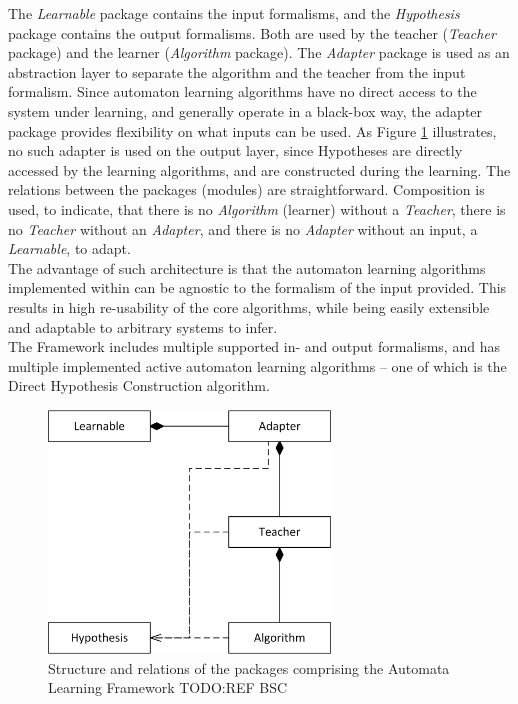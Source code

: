 \smallskip

The \textit{Learnable} package contains the input formalisms, and the \textit{Hypothesis} package contains the output formalisms. Both are used by the teacher (\textit{Teacher} package) and the learner (\textit{Algorithm} package). The \textit{Adapter} package is used as an abstraction layer to separate the algorithm and the teacher from the input formalism. Since automaton learning algorithms have no direct access to the system under learning, and generally operate in a black-box way, the adapter package provides flexibility on what inputs can be used. As Figure \ref{fig_automatalearning_packages} illustrates, no such adapter is used on the output layer, since Hypotheses are directly accessed by the learning algorithms, and are constructed during the learning. The relations between the packages (modules) are straightforward.  Composition is used, to indicate, that there is no \textit{Algorithm} (learner) without a \textit{Teacher}, there is no \textit{Teacher} without an \textit{Adapter}, and there is no \textit{Adapter} without an input, a \textit{Learnable}, to adapt. \\
The advantage of such architecture is that the automaton learning algorithms implemented within can be agnostic to the formalism of the input provided. This results in high re-usability of the core algorithms, while being easily extensible and adaptable to arbitrary systems to infer.  \\
The Framework includes multiple supported in- and output formalisms, and has multiple implemented active automaton learning algorithms -- one of which is the Direct Hypothesis Construction algorithm.

\begin{figure}[!ht] 
	\centering
	\includegraphics[width=75mm, keepaspectratio]{figures/automatalearning_packages.png}
	\caption{Structure and relations of the packages comprising the Automata Learning Framework TODO:REF BSC} 
	\label{fig_automatalearning_packages}
\end{figure}

